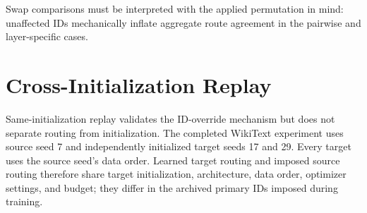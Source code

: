 \documentclass{article}
\begin{document}
\begin{table}[t]
\centering
\scriptsize
\caption{Balanced-mixture ID-permutation interventions. Loss, route agreement
with normal, and 80\% mask Jaccard are mean $\pm$ sample SD over three seeds.}
\label{tab:app_swap_controls}
\end{table}

Swap comparisons must be interpreted with the applied permutation in mind:
unaffected IDs mechanically inflate aggregate route agreement in the pairwise
and layer-specific cases.

\section{Cross-Initialization Replay}
\label{app:cross_initialization}

Same-initialization replay validates the ID-override mechanism but does not
separate routing from initialization. The completed WikiText experiment uses
source seed 7 and independently initialized target seeds 17 and 29. Every target
uses the source seed's data order. Learned target routing and imposed source
routing therefore share target initialization, architecture, data order,
optimizer settings, and budget; they differ in the archived primary IDs imposed
during training.
\end{document}
